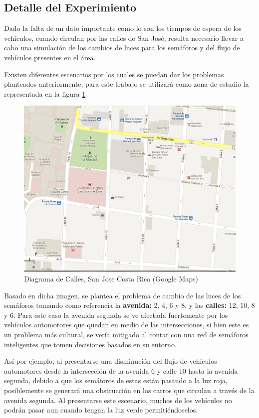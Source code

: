 \documentclass[12pt,journal,compsoc]{IEEEtran}
\begin{document}
\subsection{Detalle del Experimiento}
Dado la falta de un dato importante como lo son los tiempos de espera de los veh\'{i}culos, cuando circulan por las calles de San Jos\'{e}, resulta necesario llevar a cabo una simulaci\'{o}n de los cambios de luces para los sem\'{a}foros y del flujo de veh\'{i}culos presentes en el \'{a}rea. 

Existen diferentes escenarios por los cuales se puedan dar los problemas planteados anteriormente, para este trabajo se utilizar\'{a} como zona de estudio la representada en la figura \ref{fig:traficoSJ} 
	
	\begin{figure}[htp]
\centering
\includegraphics[scale=0.37]{images/trafico1.png}
\caption{Diagrama de Calles, San Jose Costa Rica (Google Maps)}
\label{fig:traficoSJ}
\end{figure}

		Basado en dicha imagen, se plantea el problema de cambio de las luces de los
	sem\'{a}foros tomando como referencia la \textbf{avenida:} 2, 4, 6 y 8,  y las
	\textbf{calles:}
	12, 10, 8 y 6. Para este caso la avenida segunda se ve afectada fuertemente por los veh\'{i}culos automotores que quedan en medio de las intersecciones, si bien este es un problema m\'{a}s cultural, se ver\'{i}a mitigado al contar con una red de sem\'{a}foros inteligentes que tomen decisiones basados en su entorno.
	
		As\'{i} por ejemplo, al presentarse una disminuci\'{o}n del flujo de veh\'{i}culos
	automotores desde la intersecci\'{o}n de la avenida 6 y calle 10 hasta la avenida
	segunda, debido a que los sem\'{a}foros de estas est\'{a}n pasando a la luz roja,
	posiblemente se generar\'{a} una obstrucci\'{o}n en los carros que circulan a  trav\'{e}s
	de la avenida segunda. Al presentarse este escenario, muchos de los veh\'{i}culos no podr\'{a}n pasar aun cuando tengan la luz verde permiti\'{e}ndoselos.
	
\end{document}
